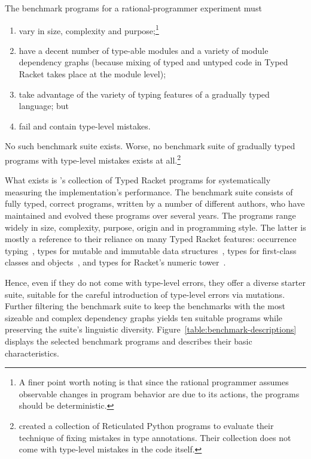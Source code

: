 
The benchmark programs for a rational-programmer experiment must 
\begin{enumerate}
   
\item vary in size, complexity and purpose;\footnote{A finer point worth noting is that since the rational programmer assumes observable changes in program behavior are due to its actions, the programs should be deterministic.}
    
\item have a decent number of type-able modules and a variety of module dependency graphs
 (because mixing of typed and untyped code in Typed Racket takes place at the
 module level);

\item take advantage of the variety of typing features of a gradually typed
 language; but

\item fail and contain type-level mistakes. 
\end{enumerate}
No such benchmark suite exists.  Worse, no benchmark suite of
gradually typed programs with type-level mistakes exists at
all.\footnote{\citet{cc-oopsla-20} created a collection of Reticulated
Python programs to evaluate their technique of fixing mistakes in type
annotations. Their collection does not come with type-level mistakes
in the code itself.}

What exists is \citet{gtnffvf-jfp-2019}'s collection of Typed Racket programs
for systematically measuring the implementation's performance. The benchmark
suite consists of fully typed, correct programs, written by a number of
different authors, who have maintained and evolved these programs over several
years. The programs range widely in size, complexity, purpose, origin and in
programming style. The latter is mostly a reference to their reliance on many
Typed Racket features: occurrence typing~\citep{tf-icfp-2010}, types for mutable
and immutable data structures~\citep{hpst-sfp-2010}, types for first-class
classes and objects~\citep{tsdtf-oopsla-2012}, and types for Racket's numeric
tower~\citep{stathff-padl-12}.

Hence, even if they do not come with type-level errors, they offer a diverse
starter suite, suitable for the careful introduction of type-level errors via
mutations. Further filtering the benchmark suite to keep the benchmarks with the
most sizeable and complex dependency graphs yields ten suitable programs while
preserving the suite's linguistic diversity. Figure~\ref{table:benchmark-descriptions} displays the selected
benchmark programs and describes their basic characteristics.
